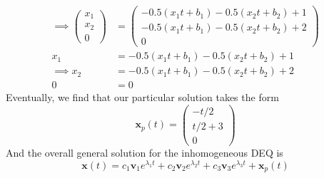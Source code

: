 \documentclass[12pt]{article}
\begin{document}
\begin{enumerate}
\begin{align*}
    \implies \begin{pmatrix}x_{1}\\ x_{2}\\ 0\end{pmatrix} &= \begin{pmatrix}-0.5(x_{1}t + b_{1})-0.5(x_{2}t + b_{2})+1\\ -0.5(x_{1}t + b_{1})-0.5(x_{2}t + b_{2})+2\\ 0\end{pmatrix}\\
    x_{1} &= -0.5(x_{1}t + b_{1})-0.5(x_{2}t + b_{2})+1\\
    \implies x_{2} &= -0.5(x_{1}t + b_{1})-0.5(x_{2}t + b_{2})+2\\
    0 &= 0
\end{align*}
Eventually, we find that our particular solution takes the form
\[
\mathbf{x}_{p}(t) = \begin{pmatrix}-t/2\\ t/2+3\\ 0\end{pmatrix}
\]
And the overall general solution for the inhomogeneous DEQ is
\[
    \mathbf{x}(t)=c_{1}\mathbf{v}_{1}e^{\lambda_{1}t} + c_{2}\mathbf{v}_{2}e^{\lambda_{2}t} + c_{3}\mathbf{v}_{3}e^{\lambda_{3}t} + \mathbf{x}_{p}(t)
\]
\end{enumerate}
\end{document}
